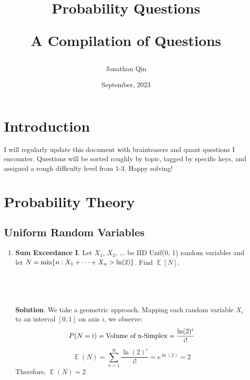 \documentclass{article}
\title{

\begin{center} \textbf{Probability Questions}

A Compilation of Questions \end{center}
}
\author{Jonathan Qin}
\date{September, 2023}
\DeclareMathOperator{\EX}{\mathbb{E}}%
\begin{document}
\maketitle

\section{Introduction}
I will regularly update this document with brainteasers and quant questions I encounter. Questions will be sorted roughly by topic, tagged by specific keys, and assigned a rough difficulty level from 1-3. Happy solving!

\section{Probability Theory}
\subsection{Uniform Random Variables}
\begin{enumerate}
    \item \textbf{Sum Exceedance I}. Let \(X_1\), \(X_2\), ... be IID Unif(0, 1) random variables and let \(N = \textup{min} \{ n:X_1 + \cdots + X_n > \ln(2) \} \). Find \(\EX[N]\).
    \\
    \\
    \\
    \\
    \\
    \textbf{Solution}. We take a geometric approach. Mapping each random variable \(X_i\) to an interval \([0, 1]\) on axis \(i\), we observe:
    \begin{equation}
        P(N = i) = \textup{Volume of n-Simplex} = \frac{\ln(2)^i}{i!}\\
    \end{equation}
    \begin{equation}
        \EX(N) = \sum_{n=1}^{\infty} \frac{\ln(2)^i}{i!} = e^{\ln(2)} = 2
    \end{equation}
    Therefore, \(\boxed{\EX(N) = 2}\).

\end{enumerate}
\end{document}
